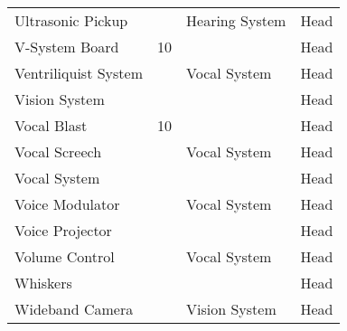 \documentclass[twoside]{book}
\begin{document}
\begin{longtable}{p{1.25in}p{2em}ll}
      \raggedright Ultrasonic Pickup && Hearing System & Head \tabularnewline
      \raggedright V-System Board & 10 && Head \tabularnewline
      \raggedright Ventriliquist System && Vocal System & Head \tabularnewline
      \raggedright Vision System &&& Head \tabularnewline
      \raggedright Vocal Blast & 10 && Head \tabularnewline
      \raggedright Vocal Screech && Vocal System & Head \tabularnewline
      \raggedright Vocal System &&& Head \tabularnewline
      \raggedright Voice Modulator && Vocal System & Head \tabularnewline
      \raggedright Voice Projector &&& Head \tabularnewline
      \raggedright Volume Control && Vocal System & Head \tabularnewline
      \raggedright Whiskers &&& Head \tabularnewline
      \raggedright Wideband Camera && Vision System & Head \tabularnewline
      
\end{longtable}
    
\end{document}
